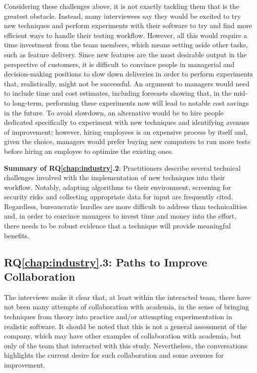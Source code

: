 Considering these challenges above, it is not exactly tackling them that is the greatest obstacle.
Instead, many interviewees say they would be excited to try new techniques and perform experiments with their software to try and find more efficient ways to handle their testing workflow.
However, all this would require a time investment from the team members, which means setting aside other tasks, such as feature delivery.
Since new features are the most desirable output in the perspective of customers, it is difficult to convince people in managerial and decision-making positions to slow down deliveries in order to perform experiments that, realistically, might not be successful.
An argument to managers would need to include time and cost estimates, including forecasts showing that, in the mid- to long-term, performing these experiments now will lead to notable cost savings in the future.
To avoid slowdown, an alternative would be to hire people dedicated specifically to experiment with new techniques and identifying avenues of improvement; however, hiring employees is an expensive process by itself and, given the choice, managers would prefer buying new computers to run more tests before hiring an employee to optimize the existing ones.

\begin{tcolorbox}%
\textbf{Summary of RQ\ref{chap:industry}.2}: 
Practitioners describe several technical challenges involved with the implementation of new techniques into their workflow.
Notably, adapting algorithms to their environment, screening for security risks and collecting appropriate data for input are frequently cited.
Regardless, bureaucratic hurdles are more difficult to address than technicalities and, in order to convince managers to invest time and money into the effort, there needs to be robust evidence that a technique will provide meaningful benefits.
\end{tcolorbox}


\subsection{RQ\ref{chap:industry}.3: Paths to Improve Collaboration}

The interviews make it clear that, at least within the interacted team, there have not been many attempts of collaboration with academia, in the sense of bringing techniques from theory into practice and/or attempting experimentation in realistic software.
It should be noted that this is not a general assessment of the company, which may have other examples of collaboration with academia, but only of the team that interacted with this study.
Nevertheless, the conversations highlights the current desire for such collaboration and some avenues for improvement.

